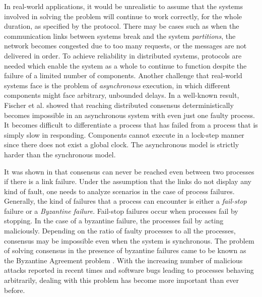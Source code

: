 In real-world applications, it would be unrealistic to assume that the systems involved in solving the problem will continue to work correctly, for the whole duration, as specified by the protocol. There may be cases such as when the communication links between systems break and the system \textit{partitions}, the network becomes congested due to too many requests, or the messages are not delivered in order. To achieve reliability in distributed systems, protocols are needed which enable the system as a whole to continue to function despite the failure of a limited number of components. Another challenge that real-world systems face is the problem of \textit{asynchronous} execution, in which different components might face arbitrary, unbounded delays. In a well-known result, Fischer et al. \cite{FischerLP83} showed that reaching distributed consensus deterministically becomes impossible in an asynchronous system with even just one faulty process. It becomes difficult to differentiate a process that has failed from a process that is simply slow in responding. Components cannot execute in a lock-step manner since there does not exist a global clock. The asynchronous model is strictly harder than the synchronous model. 

It was shown in \cite{LamportSP82} that consensus can never be reached even between two processes if there is a link failure. Under the assumption that the links do not display any kind of fault, one needs to analyze scenarios in the case of process failures. Generally, the kind of failures that a process can encounter is either a \textit{fail-stop} failure or a \textit{Byzantine failure}. Fail-stop failures occur when processes fail by stopping. In the case of a byzantine failure, the processes fail by acting maliciously. Depending on the ratio of faulty processes to all the processes, consensus may be impossible even when the system is synchronous. The problem of solving consensus in the presence of byzantine failures came to be known as the Byzantine Agreement problem \cite{LamportSP82}. With the increasing number of malicious attacks reported in recent times and software bugs leading to processes behaving arbitrarily, dealing with this problem has become more important than ever before.


